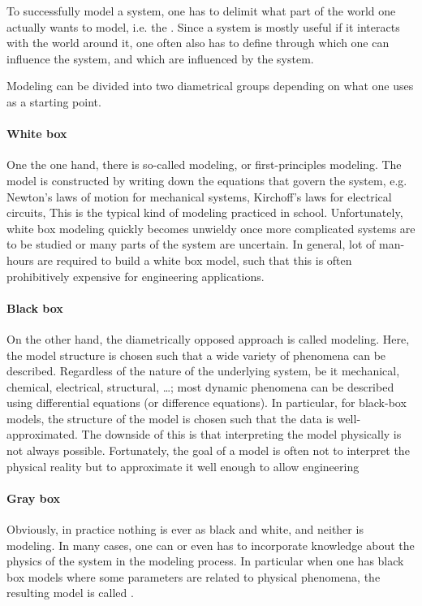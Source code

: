 To successfully model a system, one has to delimit what part of the world one actually wants to model, i.e. the .
Since a system is mostly useful if it interacts with the world around it, one often also has to define  through which one can influence the system, and  which are influenced by the system.


Modeling can be divided into two diametrical groups depending on what one uses as a starting point.
\paragraph{White box}
One the one hand, there is so-called  modeling, or first-principles modeling.
The model is constructed by writing down the equations that govern the system, e.g. Newton's laws of motion for mechanical systems, Kirchoff's laws for electrical circuits, 
This is the typical kind of modeling practiced in school.
Unfortunately, white box modeling quickly becomes unwieldy once more complicated systems are to be studied or many parts of the system are uncertain.
In general, lot of man-hours are required to build a white box model, such that this is often prohibitively expensive for engineering applications.

\paragraph{Black box}
On the other hand, the diametrically opposed approach is called  modeling.
Here, the model structure is chosen such that a wide variety of phenomena can be described.
Regardless of the nature of the underlying system, be it mechanical, chemical, electrical, structural, \ldots; most dynamic phenomena can be described using differential equations (or difference equations).
In particular, for black-box models, the structure of the model is chosen such that the data is well-approximated.
The downside of this is that interpreting the model physically is not always possible.
Fortunately, the goal of a model is often not to interpret the physical reality but to approximate it well enough to allow engineering

\paragraph{Gray box}
Obviously, in practice nothing is ever as black and white, and neither is modeling.
In many cases, one can or even has to incorporate knowledge about the physics of the system in the modeling process.
In particular when one has black box models where some parameters are related to physical phenomena, the resulting model is called .


